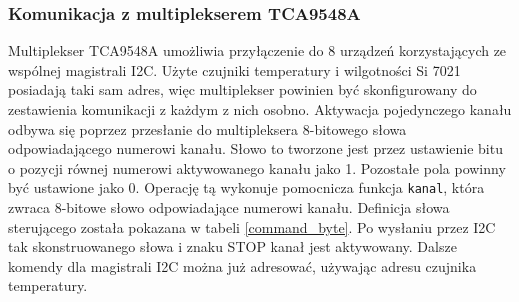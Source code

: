 \documentclass[a4paper,11pt,twoside]{article}
\begin{document}
\subsubsection{Komunikacja z multiplekserem TCA9548A}
Multiplekser TCA9548A umożliwia przyłączenie do 8 urządzeń korzystających ze wspólnej magistrali I2C. Użyte czujniki temperatury i wilgotności Si 7021 posiadają taki sam adres, więc multiplekser powinien być skonfigurowany do zestawienia komunikacji z każdym z nich osobno. Aktywacja pojedynczego kanału odbywa się poprzez przesłanie do multipleksera 8-bitowego słowa odpowiadającego numerowi kanału. Słowo to tworzone jest przez ustawienie bitu o pozycji równej numerowi aktywowanego kanału jako 1. Pozostałe pola powinny być ustawione jako 0. Operację tą wykonuje pomocnicza funkcja \texttt{kanal}, która zwraca 8-bitowe słowo odpowiadające numerowi kanału. Definicja słowa sterującego została pokazana w tabeli \ref{command_byte}. Po wysłaniu przez I2C tak skonstruowanego słowa i znaku STOP kanał jest aktywowany. Dalsze komendy dla magistrali I2C można już adresować, używając adresu czujnika temperatury.
\end{document}
